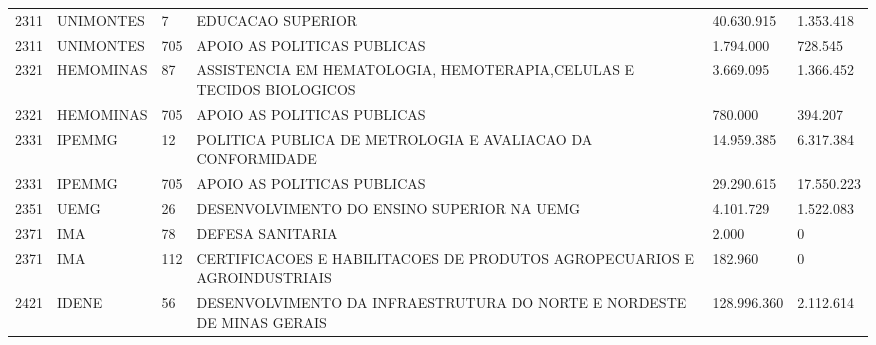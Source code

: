 \documentclass{article}
\begin{document}
\begin{longtable}[c]{m{1cm}|m{1.5cm}|m{1cm}m{8cm}|m{2cm}m{2cm}}
\multicolumn{1}{C{1cm}|}{2311} & \multicolumn{1}{L{1.5cm}|}{UNIMONTES} & \multicolumn{1}{C{1cm}|}{7} & \multicolumn{1}{L{8cm}|}{EDUCACAO SUPERIOR} & \multicolumn{1}{R{2cm}|}{40.630.915} & \multicolumn{1}{R{2cm}}{1.353.418} \\
\multicolumn{1}{C{1cm}|}{2311} & \multicolumn{1}{L{1.5cm}|}{UNIMONTES} & \multicolumn{1}{C{1cm}|}{705} & \multicolumn{1}{L{8cm}|}{APOIO AS POLITICAS PUBLICAS} & \multicolumn{1}{R{2cm}|}{1.794.000} & \multicolumn{1}{R{2cm}}{728.545} \\
\multicolumn{1}{C{1cm}|}{2321} & \multicolumn{1}{L{1.5cm}|}{HEMOMINAS} & \multicolumn{1}{C{1cm}|}{87} & \multicolumn{1}{L{8cm}|}{ASSISTENCIA EM HEMATOLOGIA, HEMOTERAPIA,CELULAS E TECIDOS BIOLOGICOS} & \multicolumn{1}{R{2cm}|}{3.669.095} & \multicolumn{1}{R{2cm}}{1.366.452} \\
\multicolumn{1}{C{1cm}|}{2321} & \multicolumn{1}{L{1.5cm}|}{HEMOMINAS} & \multicolumn{1}{C{1cm}|}{705} & \multicolumn{1}{L{8cm}|}{APOIO AS POLITICAS PUBLICAS} & \multicolumn{1}{R{2cm}|}{780.000} & \multicolumn{1}{R{2cm}}{394.207} \\
\multicolumn{1}{C{1cm}|}{2331} & \multicolumn{1}{L{1.5cm}|}{IPEMMG} & \multicolumn{1}{C{1cm}|}{12} & \multicolumn{1}{L{8cm}|}{POLITICA PUBLICA DE METROLOGIA E AVALIACAO DA CONFORMIDADE} & \multicolumn{1}{R{2cm}|}{14.959.385} & \multicolumn{1}{R{2cm}}{6.317.384} \\
\multicolumn{1}{C{1cm}|}{2331} & \multicolumn{1}{L{1.5cm}|}{IPEMMG} & \multicolumn{1}{C{1cm}|}{705} & \multicolumn{1}{L{8cm}|}{APOIO AS POLITICAS PUBLICAS} & \multicolumn{1}{R{2cm}|}{29.290.615} & \multicolumn{1}{R{2cm}}{17.550.223} \\
\multicolumn{1}{C{1cm}|}{2351} & \multicolumn{1}{L{1.5cm}|}{UEMG} & \multicolumn{1}{C{1cm}|}{26} & \multicolumn{1}{L{8cm}|}{DESENVOLVIMENTO DO ENSINO SUPERIOR NA UEMG} & \multicolumn{1}{R{2cm}|}{4.101.729} & \multicolumn{1}{R{2cm}}{1.522.083} \\
\multicolumn{1}{C{1cm}|}{2371} & \multicolumn{1}{L{1.5cm}|}{IMA} & \multicolumn{1}{C{1cm}|}{78} & \multicolumn{1}{L{8cm}|}{DEFESA SANITARIA} & \multicolumn{1}{R{2cm}|}{2.000} & \multicolumn{1}{R{2cm}}{            0} \\
\multicolumn{1}{C{1cm}|}{2371} & \multicolumn{1}{L{1.5cm}|}{IMA} & \multicolumn{1}{C{1cm}|}{112} & \multicolumn{1}{L{8cm}|}{CERTIFICACOES E HABILITACOES DE PRODUTOS AGROPECUARIOS E AGROINDUSTRIAIS} & \multicolumn{1}{R{2cm}|}{182.960} & \multicolumn{1}{R{2cm}}{            0} \\
\multicolumn{1}{C{1cm}|}{2421} & \multicolumn{1}{L{1.5cm}|}{IDENE} & \multicolumn{1}{C{1cm}|}{56} & \multicolumn{1}{L{8cm}|}{DESENVOLVIMENTO DA INFRAESTRUTURA DO NORTE E NORDESTE DE MINAS GERAIS} & \multicolumn{1}{R{2cm}|}{128.996.360} & \multicolumn{1}{R{2cm}}{2.112.614} \\

\end{longtable}
\end{document}
